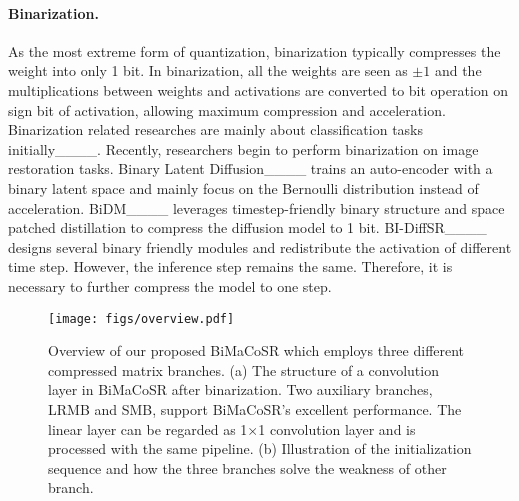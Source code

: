 \paragraph{Binarization.} 
As the most extreme form of quantization, binarization typically compresses the weight into only 1 bit.
In binarization, all the weights are seen as $\pm 1$ and the multiplications between weights and activations are converted to bit operation on sign bit of activation, allowing maximum compression and acceleration.
Binarization related researches are mainly about classification tasks initially____.
Recently, researchers begin to perform binarization on image restoration tasks.
Binary Latent Diffusion____ trains an auto-encoder with a binary latent space and mainly focus on the Bernoulli distribution instead of acceleration.
BiDM____ leverages timestep-friendly binary structure and space patched distillation to compress the diffusion model to 1 bit.
BI-DiffSR____ designs several binary friendly modules and redistribute the activation of different time step.
However, the inference step remains the same.
Therefore, it is necessary to further compress the model to one step.


\begin{figure*}[t!]
    \centering
    \texttt{[image: figs/overview.pdf]}
    \vspace{-7mm}
    \caption{Overview of our proposed BiMaCoSR which employs three different compressed matrix branches. (a) The structure of a convolution layer in BiMaCoSR after binarization. Two auxiliary branches, \ie LRMB and SMB, support BiMaCoSR's excellent performance. The linear layer can be regarded as 1$\times$1 convolution layer and is processed with the same pipeline. (b) Illustration of the initialization sequence and how the three branches solve the weakness of other branch. 
}
    \label{fig:method-overview}
    \vspace{-4.5mm}
\end{figure*}